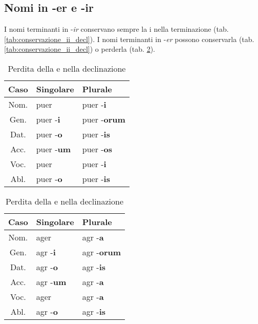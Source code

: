 \subsection{Nomi in -er e -ir}
I nomi terminanti in -\textit{ir} conservano sempre la i nella terminazione (tab. \ref{tab:conservazione_ii_decl}).
I nomi terminanti in -\textit{er} possono conservarla (tab. \ref{tab:conservazione_ii_decl}) o perderla
(tab. \ref{tab:perdita_ii_decl}).
\begin{table}[h!]
    \begin{minipage}{.4\linewidth}
        \centering
        \begin{tabular}{|c|l|l|}
            \hline
            \textbf{Caso} & \textbf{Singolare} & \textbf{Plurale} \\
            \hline
            Nom. & puer              & puer -\textbf{i} \\
            \hline
            Gen. & puer -\textbf{i}  & puer -\textbf{orum} \\
            \hline
            Dat. & puer -\textbf{o}  & puer -\textbf{is} \\
            \hline
            Acc. & puer -\textbf{um} & puer -\textbf{os} \\
            \hline
            Voc. & puer              & puer -\textbf{i} \\
            \hline
            Abl. & puer -\textbf{o}  & puer -\textbf{is} \\
            \hline
        \end{tabular}
        \caption{Conservazione della e (i) nella declinazione}\label{tab:conservazione_ii_decl}
    \end{minipage}
    \hfill
    \begin{minipage}{.4\linewidth}
        \centering
        \begin{tabular}{|c|l|l|}
            \hline
            \textbf{Caso} & \textbf{Singolare} & \textbf{Plurale} \\
            \hline
            Nom. & ager             & agr -\textbf{a} \\
            \hline
            Gen. & agr -\textbf{i}  & agr -\textbf{orum} \\
            \hline
            Dat. & agr -\textbf{o}  & agr -\textbf{is} \\
            \hline
            Acc. & agr -\textbf{um} & agr -\textbf{a} \\
            \hline
            Voc. & ager             & agr -\textbf{a} \\
            \hline
            Abl. & agr -\textbf{o}  & agr -\textbf{is} \\
            \hline
        \end{tabular}
        \caption{Perdita della e nella declinazione}\label{tab:perdita_ii_decl}
    \end{minipage}
\end{table}

